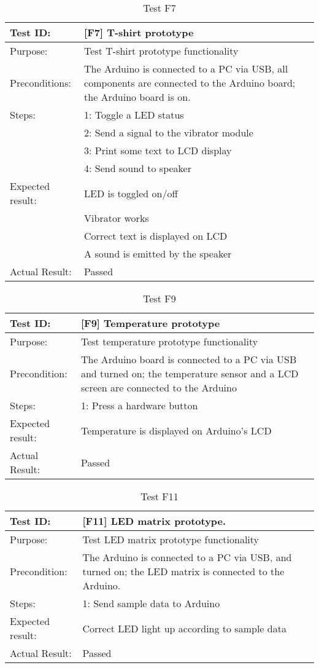 \begin{table}[h!]
\begin{tabular}{|l|p{10cm}|}
\hline Test ID: &		[F7] T-shirt prototype \\
\hline Purpose: &		Test T-shirt prototype functionality \\
\hline Preconditions: & The Arduino is connected to a PC via USB, all components
						are connected to the Arduino board; the Arduino board is
						on.\\
\hline
Steps:
 & 1: Toggle a LED status \\
 & 2: Send a signal to the vibrator module \\
 & 3: Print some text to LCD display \\
 & 4: Send sound to speaker \\
\hline
Expected result:
 & LED is toggled on/off \\
 & Vibrator works \\
 & Correct text is displayed on LCD \\
 & A sound is emitted by the speaker \\
\hline
Actual Result:
 & Passed \\
\hline
\end{tabular}
\caption{Test F7}
\label{tbl:f7test}
\end{table}


\begin{table}[h!]
\begin{tabular}{|l|p{10cm}|}
\hline Test ID: &		[F9] Temperature prototype \\
\hline Purpose: &		Test temperature prototype functionality \\
\hline Precondition: &	The Arduino board is connected to a PC via USB and
						turned on; the temperature sensor and a LCD screen are
						connected to the Arduino \\
\hline
Steps:
 & 1: Press a hardware button \\
\hline
Expected result:
 & Temperature is displayed on Arduino's LCD \\
\hline
Actual Result:
 & Passed \\
\hline
\end{tabular}
\caption{Test F9}
\label{tbl:f9test}
\end{table}


\begin{table}[h!]
\begin{tabular}{|l|p{10cm}|}
\hline Test ID: &		[F11] LED matrix prototype. \\
\hline Purpose: &		Test LED matrix prototype functionality \\
\hline Precondition: &	The Arduino is connected to a PC via USB, and turned on;
						the LED matrix is connected to the Arduino. \\
\hline
Steps:
 & 1: Send sample data to Arduino \\
\hline
Expected result:
 & Correct LED light up according to sample data \\
\hline
Actual Result:
 & Passed \\
\hline
\end{tabular}
\caption{Test F11}
\label{tbl:f11test}
\end{table}


